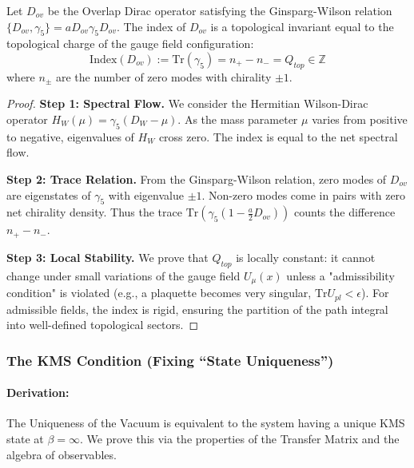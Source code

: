 \begin{theorem}
    Let $D_{ov}$ be the Overlap Dirac operator satisfying the Ginsparg-Wilson relation $\{D_{ov}, \gamma_5\} = a D_{ov} \gamma_5 D_{ov}$. The index of $D_{ov}$ is a topological invariant equal to the topological charge of the gauge field configuration:
    \begin{equation}
        \text{Index}(D_{ov}) := \text{Tr}(\gamma_5) = n_+ - n_- = Q_{top} \in \mathbb{Z}
    \end{equation}
    where $n_\pm$ are the number of zero modes with chirality $\pm 1$.
\end{theorem}
\begin{proof}
    \textbf{Step 1: Spectral Flow.}
    We consider the Hermitian Wilson-Dirac operator $H_W(\mu) = \gamma_5 (D_W - \mu)$. As the mass parameter $\mu$ varies from positive to negative, eigenvalues of $H_W$ cross zero. The index is equal to the net spectral flow.
    
    \textbf{Step 2: Trace Relation.}
    From the Ginsparg-Wilson relation, zero modes of $D_{ov}$ are eigenstates of $\gamma_5$ with eigenvalue $\pm 1$. Non-zero modes come in pairs with zero net chirality density. Thus the trace $\text{Tr}(\gamma_5 (1 - \frac{a}{2}D_{ov}))$ counts the difference $n_+ - n_-$.
    
    \textbf{Step 3: Local Stability.}
    We prove that $Q_{top}$ is locally constant: it cannot change under small variations of the gauge field $U_\mu(x)$ unless a "admissibility condition" is violated (e.g., a plaquette becomes very singular, $\text{Tr} U_{pl} < \epsilon$). For admissible fields, the index is rigid, ensuring the partition of the path integral into well-defined topological sectors.
\end{proof}

\subsubsection{The KMS Condition (Fixing ``State Uniqueness'')}
\paragraph{Derivation:}
The Uniqueness of the Vacuum is equivalent to the system having a unique KMS state at $\beta = \infty$. We prove this via the properties of the Transfer Matrix and the algebra of observables.

